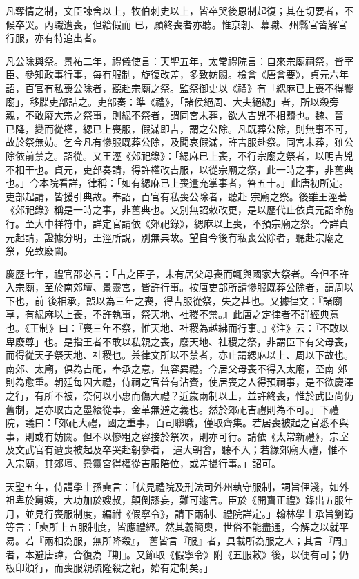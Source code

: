 \begin{pinyinscope}
 凡奪情之制，文臣諫舍以上，牧伯刺史以上，皆卒哭後恩制起復；其在切要者，不候卒哭。內職遭喪，但給假而
 已，願終喪者亦聽。惟京朝、幕職、州縣官皆解官行服，亦有特追出者。



 凡公除與祭。景祐二年，禮儀使言：天聖五年，太常禮院言：自來宗廟祠祭，皆宰臣、參知政事行事，每有服制，旋復改差，多致妨闕。檢會《唐會要》，貞元六年詔，百官有私喪公除者，聽赴宗廟之祭。監祭御史以《禮》有「緦麻已上喪不得饗廟」，移牒吏部詰之。吏部奏：準《禮》，「諸侯絕周、大夫絕緦」者，所以殺旁親，不敢廢大宗之祭事，則緦不祭者，謂同宮未葬，欲人吉兇不相黷也。魏、晉
 已降，變而從權，緦已上喪服，假滿即吉，謂之公除。凡既葬公除，則無事不可，故於祭無妨。乞今凡有慘服既葬公除，及聞哀假滿，許吉服赴祭。同宮未葬，雖公除依前禁之。詔從。又王涇《郊祀錄》：「緦麻已上喪，不行宗廟之祭者，以明吉兇不相干也。貞元，吏部奏請，得許權改吉服，以從宗廟之祭，此一時之事，非舊典也。」今本院看詳，律稱：「如有緦麻已上喪遣充掌事者，笞五十。」此唐初所定。吏部起請，皆援引典故。奉詔，百官有私喪公除者，聽赴
 宗廟之祭。後雖王涇著《郊祀錄》稱是一時之事，非舊典也。又別無詔敕改更，是以歷代止依貞元詔命施行。至大中祥符中，詳定官請依《郊祀錄》，緦麻以上喪，不預宗廟之祭。今詳貞元起請，證據分明，王涇所說，別無典故。望自今後有私喪公除者，聽赴宗廟之祭，免致廢闕。



 慶歷七年，禮官邵必言：「古之臣子，未有居父母喪而輒與國家大祭者。今但不許入宗廟，至於南郊壇、景靈宮，皆許行事。按唐吏部所請慘服既葬公除者，謂周以下也，前
 後相承，誤以為三年之喪，得吉服從祭，失之甚也。又據律文：『諸廟享，有緦麻以上喪，不許執事，祭天地、社稷不禁。』此唐之定律者不詳經典意也。《王制》曰：『喪三年不祭，惟天地、社稷為越紼而行事。』《注》云：『不敢以卑廢尊」也。是指王者不敢以私親之喪，廢天地、社稷之祭，非謂臣下有父母喪，而得從天子祭天地、社稷也。兼律文所以不禁者，亦止謂緦麻以上、周以下故也。南郊、太廟，俱為吉祀，奉承之意，無容異禮。今居父母喪不得入太廟，至南
 郊則為愈重。朝廷每因大禮，侍祠之官普有沾賚，使居喪之人得預祠事，是不欲慶澤之行，有所不被，奈何以小惠而傷大禮？近歲兩制以上，並許終喪，惟於武臣尚仍舊制，是亦取古之墨縗從事，金革無避之義也。然於郊祀吉禮則為不可。」下禮院，議曰：「郊祀大禮，國之重事，百司聯職，僅取齊集。若居喪被起之官悉不與事，則或有妨闕。但不以慘粗之容接於祭次，則亦可行。請依《太常新禮》，宗室及文武官有遭喪被起及卒哭赴朝參者，
 遇大朝會，聽不入；若緣郊廟大禮，惟不入宗廟，其郊壇、景靈宮得權從吉服陪位，或差攝行事。」詔可。



 天聖五年，侍講學士孫奭言：「伏見禮院及刑法司外州執守服制，詞旨俚淺，如外祖卑於舅姨，大功加於嫂叔，顛倒謬妄，難可遽言。臣於《開寶正禮》錄出五服年月，並見行喪服制度，編祔《假寧令》，請下兩制、禮院詳定。」翰林學士承旨劉筠等言：「奭所上五服制度，皆應禮經。然其義簡奧，世俗不能盡通，今解之以就平易。若『兩相為服，無所降殺』，
 舊皆言『服』者，具載所為服之人；其言『周』者，本避唐諱，合復為『期』。又節取《假寧令》附《五服敕》後，以便有司；仍板印頒行，而喪服親疏隆殺之紀，始有定制矣。」




\end{pinyinscope}
